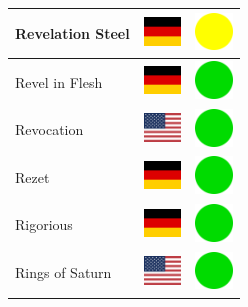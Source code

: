 \documentclass[12pt, a4paper, twoside]{report}
\begin{document}
\begin{center}
\begin{longtable}{|p{5cm}|p{2cm}|p{2cm}|}
 Revelation Steel                                           & \includegraphics[width=1cm]{../4x3/de} &   \includegraphics[width=1cm]{../likes/m} \\ \hline
 Revel in Flesh                                             & \includegraphics[width=1cm]{../4x3/de} &   \includegraphics[width=1cm]{../likes/y} \\ \hline
 Revocation                                                 & \includegraphics[width=1cm]{../4x3/us} &   \includegraphics[width=1cm]{../likes/y} \\ \hline
 Rezet                                                      & \includegraphics[width=1cm]{../4x3/de} &   \includegraphics[width=1cm]{../likes/y} \\ \hline
 Rigorious                                                  & \includegraphics[width=1cm]{../4x3/de} &   \includegraphics[width=1cm]{../likes/y} \\ \hline
 Rings of Saturn                                            & \includegraphics[width=1cm]{../4x3/us} &   \includegraphics[width=1cm]{../likes/y} \\ \hline

\end{longtable}
\end{center}
\end{document}
